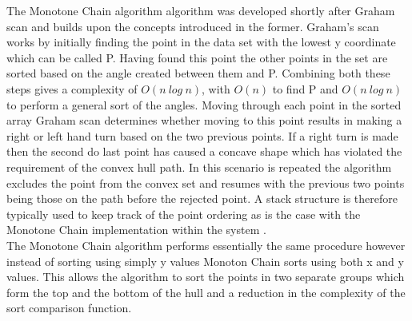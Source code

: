 \noindent
The Monotone Chain algorithm algorithm was developed shortly after Graham scan and builds upon the concepts introduced in the former. Graham's scan works by initially finding the point in the data set with the lowest y coordinate which can be called P. Having found this point the other points in the set are sorted based on the angle created between them and P. Combining both these steps gives a complexity of $O(n\ log\ n)$, with  $O(n)$ to find P and $O(n\ log\ n)$ to perform a general sort of the angles. Moving through each point in the sorted array Graham scan determines whether moving to this point results in making a right or left hand turn based on the two previous points. If a right turn is made then the second do last point has caused a concave shape which has violated the requirement of the convex hull path. In this scenario is repeated the algorithm excludes the point from the convex set and resumes with the previous two points being those on the path before the rejected point. A stack structure is therefore typically used to keep track of the point ordering as is the case with the Monotone Chain implementation within the system \cite{ChainHull}. \\ 

\noindent
The Monotone Chain algorithm performs essentially the same procedure however instead of sorting using simply y values Monoton Chain sorts using both x and y values. This allows the algorithm to sort the points in two separate groups which form the top and the bottom of the hull and a reduction in the complexity of the sort comparison function. \\ \\ 

